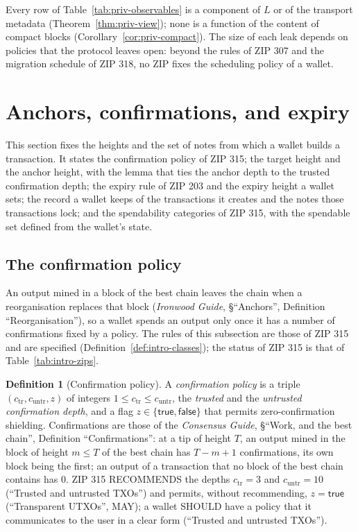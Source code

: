\documentclass[11pt,a4paper]{article}
\theoremstyle{definition}
\newtheorem{definition}[theorem]{Definition}
\begin{document}
Every row of Table~\ref{tab:priv-observables} is a component of $L$ or of
the transport metadata (Theorem~\ref{thm:priv-view}); none is a function of
the content of compact blocks (Corollary~\ref{cor:priv-compact}). The size
of each leak depends on policies that the protocol leaves open: beyond the
rules of ZIP 307 and the migration schedule of ZIP 318, no ZIP fixes the
scheduling policy of a wallet.

\section{Anchors, confirmations, and expiry}\label{sec:spendability}

This section fixes the heights and the set of notes from which a wallet
builds a transaction. It states the confirmation policy of ZIP 315; the
target height and the anchor height, with the lemma that ties the anchor
depth to the trusted confirmation depth; the expiry rule of ZIP 203 and the
expiry height a wallet sets; the record a wallet keeps of the transactions it
creates and the notes those transactions lock; and the spendability
categories of ZIP 315, with the spendable set defined from the wallet's
state.

\subsection{The confirmation policy}\label{sec:spend-confirmations}

An output mined in a block of the best chain leaves the chain when a
reorganisation replaces that block (\emph{Ironwood Guide}, \S``Anchors'',
Definition ``Reorganisation''), so a wallet spends an output only once it has a
number of confirmations fixed by a policy. The rules of this subsection are
those of ZIP 315 and are specified (Definition~\ref{def:intro-classes}); the
status of ZIP 315 is that of Table~\ref{tab:intro-zips}.

\begin{definition}[Confirmation policy]\label{def:spend-policy}
A \emph{confirmation policy} is a triple $(c_{\mathrm{tr}},
c_{\mathrm{untr}}, z)$ of integers $1 \le c_{\mathrm{tr}} \le
c_{\mathrm{untr}}$, the \emph{trusted} and the \emph{untrusted confirmation
depth}, and a flag $z \in \{\mathsf{true}, \mathsf{false}\}$ that permits
zero-confirmation shielding. Confirmations are those of the \emph{Consensus
Guide}, \S``Work, and the best chain'', Definition ``Confirmations'': at a tip
of height $T$, an output
mined in the block of height $m \le T$ of the best chain has $T - m + 1$
confirmations, its own block being the first; an output of a transaction
that no block of the best chain contains has $0$. ZIP 315 RECOMMENDS the
depths $c_{\mathrm{tr}} = 3$ and $c_{\mathrm{untr}} = 10$ (``Trusted and
untrusted TXOs'') and permits, without recommending, $z = \mathsf{true}$
(``Transparent UTXOs'', MAY); a wallet SHOULD have a policy that it
communicates to the user in a clear form (``Trusted and untrusted TXOs'').
\end{definition}
\end{document}

